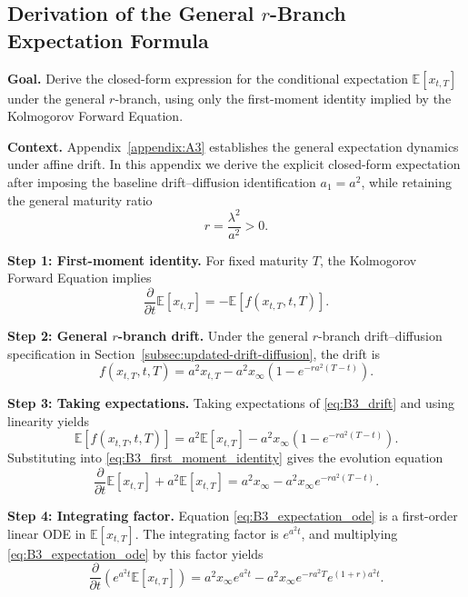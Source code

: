 \documentclass[12pt]{article}
\theoremstyle{statementstyle}
\begin{document}
\begin{appendices}
\subsection{Derivation of the General \(r\)-Branch Expectation Formula}
\label{appendix:B3}

\textbf{Goal.}
Derive the closed-form expression for the conditional expectation
\(\mathbb{E}[x_{t,T}]\) under the general \(r\)-branch, using only the first-moment identity
implied by the Kolmogorov Forward Equation.

\medskip
\noindent\textbf{Context.}
Appendix~\ref{appendix:A3} establishes the general expectation dynamics under affine
drift. In this appendix we derive the explicit closed-form expectation after imposing the
baseline drift--diffusion identification \(a_1=a^2\), while retaining the general maturity
ratio
\[
r=\frac{\lambda^2}{a^2}>0.
\]

\medskip
\noindent\textbf{Step 1: First-moment identity.}
For fixed maturity \(T\), the Kolmogorov Forward Equation implies
\begin{equation}
\frac{\partial}{\partial t}\mathbb{E}[x_{t,T}]
=
-\mathbb{E}\!\left[f(x_{t,T},t,T)\right].
\label{eq:B3_first_moment_identity}
\tag{B.3.1}
\end{equation}

\medskip
\noindent\textbf{Step 2: General \(r\)-branch drift.}
Under the general \(r\)-branch drift--diffusion specification in
Section~\ref{subsec:updated-drift-diffusion}, the drift is
\begin{equation}
f(x_{t,T},t,T)
=
a^{2}x_{t,T}
-
a^{2}x_{\infty}\!\left(1-e^{-ra^{2}(T-t)}\right).
\label{eq:B3_drift}
\tag{B.3.2}
\end{equation}

\medskip
\noindent\textbf{Step 3: Taking expectations.}
Taking expectations of \eqref{eq:B3_drift} and using linearity yields
\[
\mathbb{E}[f(x_{t,T},t,T)]
=
a^{2}\mathbb{E}[x_{t,T}]
-
a^{2}x_{\infty}\!\left(1-e^{-ra^{2}(T-t)}\right).
\]
Substituting into \eqref{eq:B3_first_moment_identity} gives the evolution equation
\begin{equation}
\frac{\partial}{\partial t}\mathbb{E}[x_{t,T}]
+
a^{2}\mathbb{E}[x_{t,T}]
=
a^{2}x_{\infty}
-
a^{2}x_{\infty}e^{-ra^{2}(T-t)}.
\label{eq:B3_expectation_ode}
\tag{B.3.3}
\end{equation}

\medskip
\noindent\textbf{Step 4: Integrating factor.}
Equation \eqref{eq:B3_expectation_ode} is a first-order linear ODE in
\(\mathbb{E}[x_{t,T}]\). The integrating factor is \(e^{a^{2}t}\), and multiplying
\eqref{eq:B3_expectation_ode} by this factor yields
\[
\frac{\partial}{\partial t}
\left(e^{a^{2}t}\mathbb{E}[x_{t,T}]\right)
=
a^{2}x_{\infty}e^{a^{2}t}
-
a^{2}x_{\infty}e^{-ra^{2}T}e^{(1+r)a^{2}t}.
\]


\end{appendices}
\end{document}
